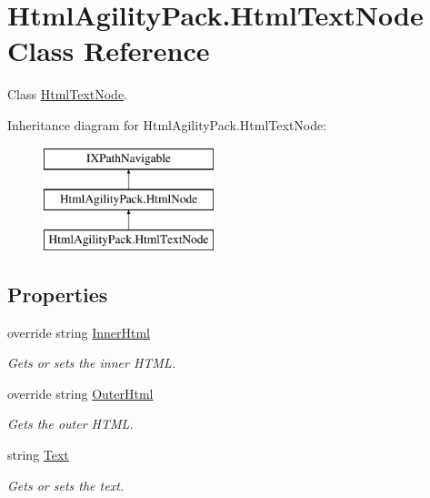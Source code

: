 \hypertarget{class_html_agility_pack_1_1_html_text_node}{}\section{Html\+Agility\+Pack.\+Html\+Text\+Node Class Reference}
\label{class_html_agility_pack_1_1_html_text_node}


Class \hyperlink{class_html_agility_pack_1_1_html_text_node}{Html\+Text\+Node}.  


Inheritance diagram for Html\+Agility\+Pack.\+Html\+Text\+Node\+:\begin{figure}[H]
\begin{center}
\leavevmode
\includegraphics[height=3.000000cm]{class_html_agility_pack_1_1_html_text_node}
\end{center}
\end{figure}
\subsection*{Properties}
\begin{DoxyCompactItemize}
\item 
override string \hyperlink{class_html_agility_pack_1_1_html_text_node_a4b997c12c07eef9965d6a6541bfa3fee}{Inner\+Html}
\begin{DoxyCompactList}\small\item\em Gets or sets the inner H\+T\+ML. \end{DoxyCompactList}\item 
override string \hyperlink{class_html_agility_pack_1_1_html_text_node_a3f28a4635a2a285295c122290dac906c}{Outer\+Html}
\begin{DoxyCompactList}\small\item\em Gets the outer H\+T\+ML. \end{DoxyCompactList}\item 
string \hyperlink{class_html_agility_pack_1_1_html_text_node_ae5d4da856a540bd9b275e5ae9aa38e28}{Text}
\begin{DoxyCompactList}\small\item\em Gets or sets the text. \end{DoxyCompactList}\end{DoxyCompactItemize}
